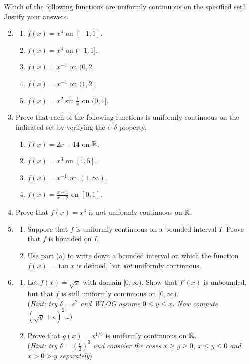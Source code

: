 \begin{exercises}
\exstart Which of the following functions are uniformly continuous on the specified set? Justify your answers.\vspace{-5pt}
\begin{enumerate}\setcounter{enumi}{1}  
  \item[]\begin{enumerate}
    \item $f(x)=x^4$ on $[-1,1]$.
    \item $f(x)=x^4$ on $(-1,1]$.
    \item $f(x)=x^{-4}$ on $(0,2]$.
    \item $f(x)=x^{-4}$ on $(1,2]$.
    \item $f(x)=x^2\sin\frac 1x$ on $(0,1]$.
  \end{enumerate}
  
  \item Prove that each of the following functions is uniformly continuous on the indicated set by verifying the $\epsilon$--$\delta$ property.
  \begin{enumerate}
    \item $f(x)=2x-14$ on $\mathbb{R}$.
    \item $f(x)=x^3$ on $[1,5]$.
    \item $f(x)=x^{-1}$ on $(1,\infty)$.
    \item $f(x)=\frac{x+1}{x+2}$ on $[0,1]$.
  \end{enumerate}
  
  \item Prove that $f(x)=x^4$ is not uniformly continuous on $\mathbb{R}$.
  
  \item\begin{enumerate}
     \item Suppose that $f$ is uniformly continuous on a bounded interval $I$. Prove that $f$ is bounded on $I$.
     \item Use part (a) to write down a bounded interval on which the function $f(x)=\tan x$ is defined, but \emph{not} uniformly continuous.
  \end{enumerate} 

  \item\label{exs:unifroots}\begin{enumerate}
    \item Let $f(x)=\sqrt x$ with domain $[0,\infty)$. Show that $f'(x)$ is unbounded, but that $f$ is still uniformly continuous on $[0,\infty)$.\\
    (\emph{Hint: try $\delta=\epsilon^2$ and WLOG assume $0\le y\le x$. Now compute $(\sqrt y+\epsilon)^2$\ldots })
    \item Prove that $g(x)=x^{1/3}$ is uniformly continuous on $\mathbb{R}$.\\
    (\emph{Hint: try $\delta=(\frac\epsilon 2)^3$ and consider the cases $x\ge y\ge 0$, $x\le y\le 0$ and $x>0>y$ separately})
  \end{enumerate}
\end{enumerate}
\end{exercises}
\vfil
\goodbreak



